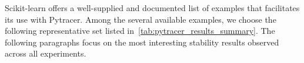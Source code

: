 \documentclass[11pt]{article}
\newcommand{\tristan}[1]{\color{orange}\textbf{From Tristan:} #1\color{black}\xspace}
\begin{document}
Scikit-learn offers a well-supplied and documented list of examples 
that facilitates its use with Pytracer.
Among the several available examples, we choose the following representative set
listed in~\ref{tab:pytracer_results_summary}. The following paragraphs 
focus on the most interesting stability results observed across all experiments.




\end{document}
